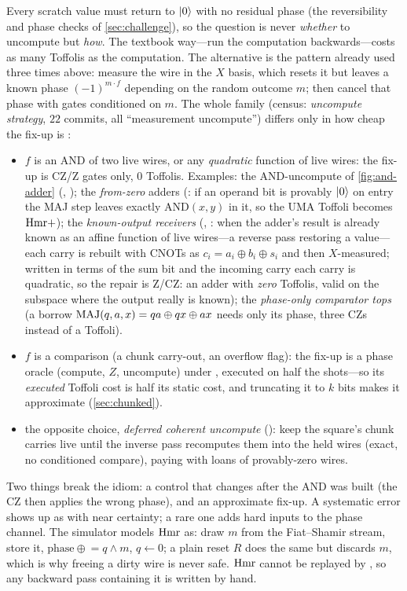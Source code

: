 Every scratch value must return to $\lvert 0 \rangle$ with no residual phase (the reversibility and phase checks of \cref{sec:challenge}), so the question is never \emph{whether} to uncompute but \emph{how}. The textbook way---run the computation backwards---costs as many Toffolis as the computation. The alternative is the pattern already used three times above: measure the wire in the $X$ basis, which resets it but leaves a known phase $(-1)^{m\cdot f}$ depending on the random outcome $m$; then cancel that phase with gates conditioned on $m$. The whole family (census: \emph{uncompute strategy}, $22$ commits, all ``measurement uncompute'') differs only in how cheap the fix-up is \cite{ecdsafail26,ecdsafail-wiki}:
\begin{itemize}[nosep]
\item $f$ is an AND of two live wires, or any \emph{quadratic} function of live wires: the fix-up is CZ/Z gates only, $0$ Toffolis. Examples: the AND-uncompute of \cref{fig:and-adder} (, ); the \emph{from-zero} adders (: if an operand bit is provably $\lvert 0 \rangle$ on entry the MAJ step leaves exactly $\mathrm{AND}(x,y)$ in it, so the UMA Toffoli becomes $\mathrm{Hmr}+$); the \emph{known-output receivers} (, : when the adder's result is already known as an affine function of live wires---a reverse pass restoring a value---each carry is rebuilt with CNOTs as $c_i=a_i\oplus b_i\oplus s_i$ and then $X$-measured; written in terms of the sum bit and the incoming carry each carry is quadratic, so the repair is Z/CZ: an adder with \emph{zero} Toffolis, valid on the subspace where the output really is known); the \emph{phase-only comparator tops} (a borrow $\mathrm{MAJ}(q,a,x)=qa\oplus qx\oplus ax$ needs only its phase, three CZs instead of a Toffoli).
\item $f$ is a comparison (a chunk carry-out, an overflow flag): the fix-up is a phase oracle (compute, $Z$, uncompute) under , executed on half the shots---so its \emph{executed} Toffoli cost is half its static cost, and truncating it to $k$ bits makes it approximate (\cref{sec:chunked}).
\item the opposite choice, \emph{deferred coherent uncompute} (): keep the square's chunk carries live until the inverse pass recomputes them into the held wires (exact, no conditioned compare), paying with loans of provably-zero wires.
\end{itemize}
Two things break the idiom: a control that changes after the AND was built (the CZ then applies the wrong phase), and an approximate fix-up. A systematic error shows up as  with near certainty; a rare one adds hard inputs to the phase channel. The simulator models $\mathrm{Hmr}$ as: draw $m$ from the Fiat--Shamir stream, store it, $\mathrm{phase}\mathrel{\oplus}=q\wedge m$, $q\gets0$; a plain reset $R$ does the same but discards $m$, which is why freeing a dirty wire is never safe. $\mathrm{Hmr}$ cannot be replayed by , so any backward pass containing it is written by hand.

